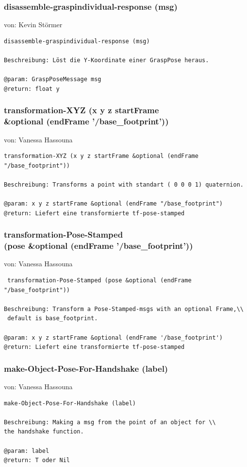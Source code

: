 \documentclass{suturo}
\makeatletter
\newcommand{\chapterauthor}[1]{%
  {\parindent0pt\vspace*{-27pt}%
  \linespread{0}\small\begin{flushright}von: #1\end{flushright}%
  \par\nobreak\vspace*{0pt}}
  \@afterheading%
}
\makeatother
\begin{document}
\subsubsection{disassemble-graspindividual-response (msg)}
\chapterauthor{Kevin Störmer}
\begin{verbatim}
disassemble-graspindividual-response (msg)

Beschreibung: Löst die Y-Koordinate einer GraspPose heraus.

@param: GraspPoseMessage msg
@return: float y
\end{verbatim}


\subsubsection{transformation-XYZ (x y z startFrame\\
\&optional (endFrame '/base\_footprint'))}
\chapterauthor{Vanessa Hassouna}
\begin{verbatim}
transformation-XYZ (x y z startFrame &optional (endFrame "/base_footprint"))

Beschreibung: Transforms a point with standart ( 0 0 0 1) quaternion.

@param: x y z startFrame &optional (endFrame "/base_footprint")
@return: Liefert eine transformierte tf-pose-stamped
\end{verbatim}


\subsubsection{ transformation-Pose-Stamped \\
(pose \&optional (endFrame '/base\_footprint')) }
\chapterauthor{Vanessa Hassouna}
\begin{verbatim}
 transformation-Pose-Stamped (pose &optional (endFrame "/base_footprint")) 

Beschreibung: Transform a Pose-Stamped-msgs with an optional Frame,\\
 default is base_footprint.

@param: x y z startFrame &optional (endFrame '/base_footprint')
@return: Liefert eine transformierte tf-pose-stamped
\end{verbatim}




\subsubsection{make-Object-Pose-For-Handshake (label)}
\chapterauthor{Vanessa Hassouna}
\begin{verbatim}
make-Object-Pose-For-Handshake (label)

Beschreibung: Making a msg from the point of an object for \\
the handshake function.

@param: label
@return: T oder Nil
\end{verbatim}
\end{document}
